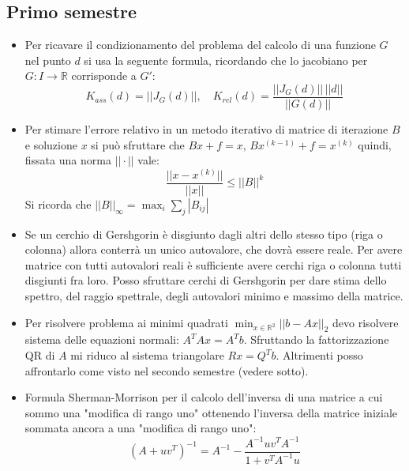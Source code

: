 \documentclass[a4paper,10pt]{article}
\theoremstyle{definition}
\newcommand{\numberset}{\mathbb} %
\newcommand{\R}{\numberset{R}}
\theoremstyle{indentdefinition}
\theoremstyle{indenttheorem}
\theoremstyle{myremark}
\theoremstyle{indentgeneral}
\theoremstyle{plain}
\theoremstyle{plain}
\begin{document}
\subsection{Primo semestre}
\begin{itemize}
    
    \item Per ricavare il condizionamento del problema del calcolo di una funzione $G$ nel punto $d$ si usa la seguente formula, ricordando che lo jacobiano per $G:I\to\R$ corrisponde a $G'$:
    \[
    K_{ass}(d) = ||J_G(d)|| , \quad K_{rel}(d) = \frac{||J_G(d)||\,||d||}{||G(d)||}
    \]
    
    \item Per stimare l'errore relativo in un metodo iterativo di matrice di iterazione $B$ e soluzione $x$ si può sfruttare che $Bx + f = x,\,Bx^{(k-1)}+f=x^{(k)}$ quindi, fissata una norma $||\cdot||$ vale:
    \[
    \frac{||x-x^{(k)}||}{||x||} \le ||B||^k
    \]
    Si ricorda che $||B||_\infty = \max_i \sum_j |B_{ij}|$

    \item Se un cerchio di Gershgorin è disgiunto dagli altri dello stesso tipo (riga o colonna) allora conterrà un unico autovalore, che dovrà essere reale. Per avere matrice con tutti autovalori reali è sufficiente avere cerchi riga o colonna tutti disgiunti fra loro.
    Posso sfruttare cerchi di Gershgorin per dare stima dello spettro, del raggio spettrale, degli autovalori minimo e massimo della matrice.
    
    \item Per risolvere problema ai minimi quadrati $\min_{x\in\R^2}||b-Ax||_2$ devo risolvere sistema delle equazioni normali: $A^TAx=A^Tb$. Sfruttando la fattorizzazione QR di $A$ mi riduco al sistema triangolare $Rx=Q^Tb$. Altrimenti posso affrontarlo come visto nel secondo semestre (vedere sotto).

    \item Formula Sherman-Morrison per il calcolo dell'inversa di una matrice a cui sommo una "modifica di rango uno" ottenendo l'inversa della matrice iniziale sommata ancora a una "modifica di rango uno":
    \[
    (A+uv^T)^{-1} = A^{-1} - \frac{A^{-1}uv^TA^{-1}}{1+v^TA^{-1}u}
    \]
\end{itemize}
\end{document}
